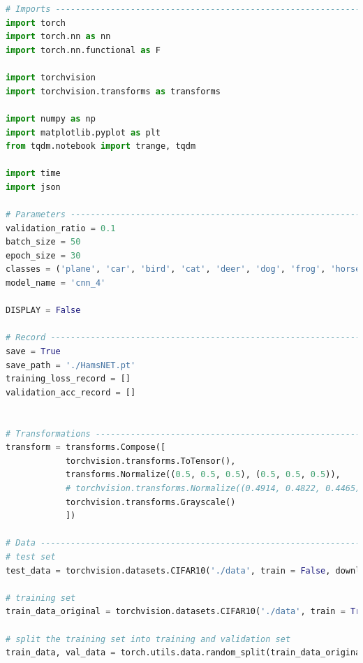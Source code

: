 \documentclass[3p,times,procedia]{elsarticle}
\begin{document}
\begin{lstlisting}[language=Python]


# Imports --------------------------------------------------------------------------------------------------------------------------------------------#
import torch
import torch.nn as nn
import torch.nn.functional as F

import torchvision
import torchvision.transforms as transforms

import numpy as np
import matplotlib.pyplot as plt
from tqdm.notebook import trange, tqdm

import time
import json

# Parameters ------------------------------------------------------------------------------------------------------------------------------------#
validation_ratio = 0.1
batch_size = 50
epoch_size = 30
classes = ('plane', 'car', 'bird', 'cat', 'deer', 'dog', 'frog', 'horse', 'ship', 'truck')
model_name = 'cnn_4'

DISPLAY = False

# Record ----------------------------------------------------------------------------------------------------------------------------------------------#
save = True
save_path = './HamsNET.pt'
training_loss_record = []
validation_acc_record = []


# Transformations ------------------------------------------------------------------------------------------------------------------------------------#
transform = transforms.Compose([
            torchvision.transforms.ToTensor(),
            transforms.Normalize((0.5, 0.5, 0.5), (0.5, 0.5, 0.5)),
            # torchvision.transforms.Normalize((0.4914, 0.4822, 0.4465), (0.247, 0.243, 0.261)),
            torchvision.transforms.Grayscale()
            ])

# Data ----------------------------------------------------------------------------------------------------------------------------------------------#
# test set
test_data = torchvision.datasets.CIFAR10('./data', train = False, download = True, transform = transform)

# training set
train_data_original = torchvision.datasets.CIFAR10('./data', train = True, download = True,transform = transform)

# split the training set into training and validation set
train_data, val_data = torch.utils.data.random_split(train_data_original, [int(len(train_data_original)*(1-validation_ratio)), int(len(train_data_original)*validation_ratio)])


\end{lstlisting}
\end{document}
